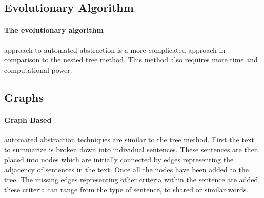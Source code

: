 \subsection{ Evolutionary Algorithm}

	\paragraph{The evolutionary algorithm} approach to automated abstraction is a more complicated approach in comparison to the nested tree method. This method also requires more time and computational power.


\subsection{Graphs}

	\paragraph{Graph Based} automated abstraction techniques are similar to the tree method. First the text to summarize is broken down into individual sentences. These sentences are then placed into nodes which are initially connected by edges representing the adjacency of sentences in the text. Once all the nodes have been added to the tree. The missing edges representing other criteria within the sentence are added, these criteria can range from the type of sentence, to shared or similar words. 